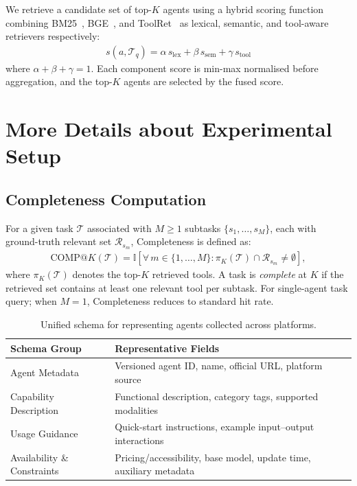 \documentclass{article} %
\begin{document}
We retrieve a candidate set of top-$K$ agents using a hybrid scoring function
combining BM25~\citep{robertson2009probabilistic}, BGE~\citep{xiao2024cpack},
and ToolRet~\citep{shi2025retrieval} as lexical, semantic, and tool-aware
retrievers respectively:
\begin{align}
    s(a, \mathcal{T}_q) = \alpha\,s_{\text{lex}} + \beta\,s_{\text{sem}} + \gamma\,s_{\text{tool}}
\end{align}
where $\alpha + \beta + \gamma = 1$. Each component score is min-max normalised
before aggregation, and the top-$K$ agents are selected by the fused score.


\section{More Details about Experimental Setup}

\subsection{Completeness Computation}

For a given task $\mathcal{T}$ associated with $M \geq 1$ subtasks
$\{s_1, \dots, s_M\}$, each with ground-truth relevant set $\mathcal{R}_{s_m}$,
Completeness is defined as:
\begin{align}
    \text{COMP@}K(\mathcal{T}) = \mathbb{I}\!\left[
    \forall\, m \in \{1,\dots,M\} :
    \pi_K(\mathcal{T}) \cap \mathcal{R}_{s_m} \neq \emptyset
    \right],
\end{align}
where $\pi_K(\mathcal{T})$ denotes the top-$K$ retrieved tools.
A task is \textit{complete} at $K$ if the retrieved set contains at least
one relevant tool per subtask. For single-agent task query; when $M = 1$, Completeness reduces to
standard hit rate.

\begin{table}[t]
\centering
\small
\begin{tabular}{p{4cm} p{9cm}}
\toprule
\textbf{Schema Group} & \textbf{Representative Fields} \\
\midrule
Agent Metadata & Versioned agent ID, name, official URL, platform source \\
Capability Description & Functional description, category tags, supported modalities \\
Usage Guidance & Quick-start instructions, example input–output interactions \\
Availability \& Constraints & Pricing/accessibility, base model, update time, auxiliary metadata \\
\bottomrule
\end{tabular}
\caption{Unified schema for representing agents collected across platforms.}
\label{tab:schema}
\end{table}
\end{document}
